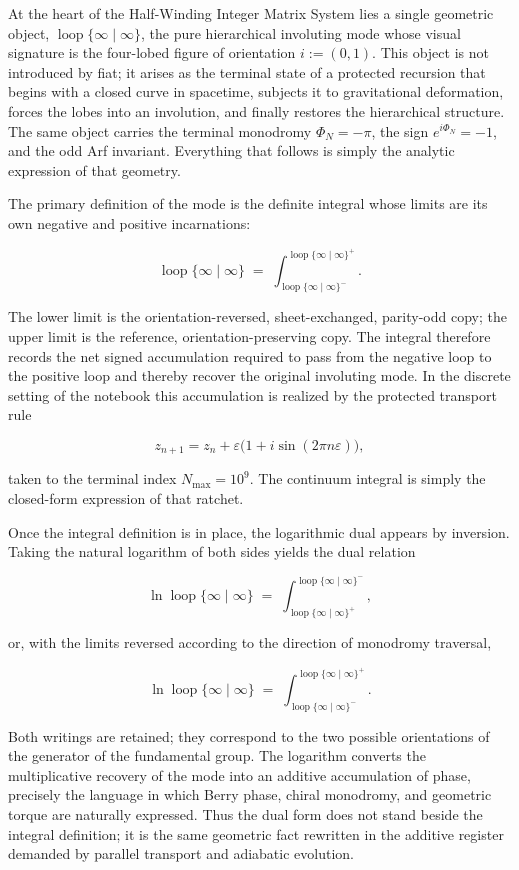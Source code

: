 At the heart of the Half-Winding Integer Matrix System lies a single geometric object, \(\operatorname{loop}\{\infty\mid\infty\}\), the pure hierarchical involuting mode whose visual signature is the four-lobed figure of orientation \(i:=(0,1)\). This object is not introduced by fiat; it arises as the terminal state of a protected recursion that begins with a closed curve in spacetime, subjects it to gravitational deformation, forces the lobes into an involution, and finally restores the hierarchical structure. The same object carries the terminal monodromy \(\Phi_N=-\pi\), the sign \(e^{i\Phi_N}=-1\), and the odd Arf invariant. Everything that follows is simply the analytic expression of that geometry.

The primary definition of the mode is the definite integral whose limits are its own negative and positive incarnations:

\[
\operatorname{loop}\{\infty\mid\infty\}
\;=\;
\int_{\operatorname{loop}\{\infty\mid\infty\}^{-}}^{\operatorname{loop}\{\infty\mid\infty\}^{+}}.
\]

The lower limit is the orientation-reversed, sheet-exchanged, parity-odd copy; the upper limit is the reference, orientation-preserving copy. The integral therefore records the net signed accumulation required to pass from the negative loop to the positive loop and thereby recover the original involuting mode. In the discrete setting of the notebook this accumulation is realized by the protected transport rule

\[
z_{n+1}=z_n+\varepsilon\bigl(1+i\sin(2\pi n\varepsilon)\bigr),
\]

taken to the terminal index \(N_{\max}=10^9\). The continuum integral is simply the closed-form expression of that ratchet.

Once the integral definition is in place, the logarithmic dual appears by inversion. Taking the natural logarithm of both sides yields the dual relation

\[
\ln\operatorname{loop}\{\infty\mid\infty\}
\;=\;
\int_{\operatorname{loop}\{\infty\mid\infty\}^{+}}^{\operatorname{loop}\{\infty\mid\infty\}^{-}},
\]

or, with the limits reversed according to the direction of monodromy traversal,

\[
\ln\operatorname{loop}\{\infty\mid\infty\}
\;=\;
\int_{\operatorname{loop}\{\infty\mid\infty\}^{-}}^{\operatorname{loop}\{\infty\mid\infty\}^{+}}.
\]

Both writings are retained; they correspond to the two possible orientations of the generator of the fundamental group. The logarithm converts the multiplicative recovery of the mode into an additive accumulation of phase, precisely the language in which Berry phase, chiral monodromy, and geometric torque are naturally expressed. Thus the dual form does not stand beside the integral definition; it is the same geometric fact rewritten in the additive register demanded by parallel transport and adiabatic evolution.

